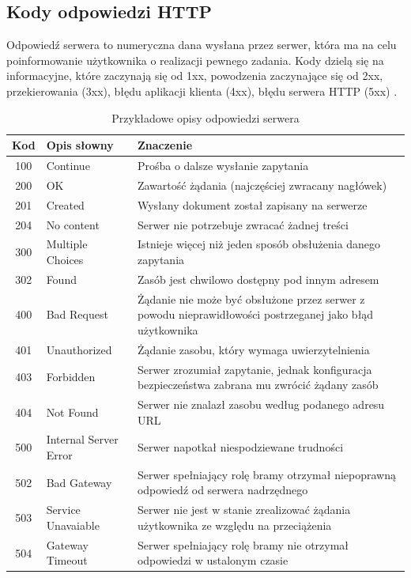 \subsection*{Kody odpowiedzi HTTP}
Odpowiedź serwera to numeryczna dana wysłana przez serwer, która ma na celu poinformowanie użytkownika o realizacji pewnego zadania. Kody dzielą się na informacyjne, które zaczynają się od 1xx, powodzenia zaczynające się od 2xx, przekierowania (3xx), błędu aplikacji klienta (4xx), błędu serwera HTTP (5xx) \cite{TempWiki}.
\begin{table}[H]
	\centering
	\caption{Przykładowe opisy odpowiedzi serwera}
	\begin{tabular}{|c|p{2cm}|p{10cm}|}
		\hline
		\textbf{Kod} & \textbf{Opis słowny} & \textbf{Znaczenie} \\ \hline
		100 & Continue & Prośba o dalsze wysłanie zapytania \\ \hline
		200 & OK & Zawartość żądania (najczęściej zwracany nagłówek)\\ \hline
		201 & Created & Wysłany dokument został zapisany na serwerze \\ \hline
		204 & No content & Serwer nie potrzebuje zwracać żadnej treści \\ \hline
		300 & Multiple Choices & Istnieje więcej niż jeden sposób obsłużenia danego zapytania \\ \hline
		302 & Found & Zasób jest chwilowo dostępny pod innym adresem \\ \hline
		400 & Bad Request & Żądanie nie może być obsłużone przez serwer z powodu nieprawidłowości postrzeganej jako błąd użytkownika \\ \hline
		401 & Unauthorized & Żądanie zasobu, który wymaga uwierzytelnienia \\ \hline
		403 & Forbidden & Serwer zrozumiał zapytanie, jednak konfiguracja bezpieczeństwa zabrana mu zwrócić żądany zasób \\ \hline
		404 & Not Found & Serwer nie znalazł zasobu według podanego adresu URL\\ \hline
		500 & Internal Server Error & Serwer napotkał niespodziewane trudności \\ \hline
		502 & Bad Gateway & Serwer spełniający rolę bramy otrzymał niepoprawną odpowiedź od serwera nadrzędnego \\ \hline
		503 & Service Unavaiable & Serwer nie jest w stanie zrealizować żądania użytkownika ze względu na przeciążenia \\ \hline
		504 & Gateway Timeout & Serwer spełniający rolę bramy nie otrzymał odpowiedzi w ustalonym czasie \\ \hline
	\end{tabular}
\end{table}

